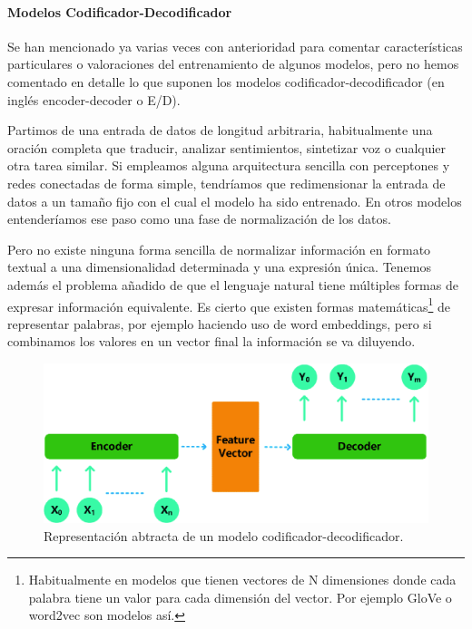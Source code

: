 \paragraph{Modelos Codificador-Decodificador}

Se han mencionado ya varias veces con anterioridad para comentar características particulares o valoraciones del entrenamiento de algunos modelos, pero no hemos comentado en detalle lo que suponen los modelos codificador-decodificador (en inglés encoder-decoder o E/D). 

Partimos de una entrada de datos de longitud arbitraria, habitualmente una oración completa que traducir, analizar sentimientos, sintetizar voz o cualquier otra tarea similar. Si empleamos alguna arquitectura sencilla con perceptones y redes conectadas de forma simple, tendríamos que redimensionar la entrada de datos a un tamaño fijo con el cual el modelo ha sido entrenado. En otros modelos entenderíamos ese paso como una fase de normalización de los datos.

Pero no existe ninguna forma sencilla de normalizar información en formato textual a una dimensionalidad determinada y una expresión única. Tenemos además el problema añadido de que el lenguaje natural tiene múltiples formas de expresar información equivalente. Es cierto que existen formas matemáticas\footnote{Habitualmente en modelos que tienen vectores de N dimensiones donde cada palabra tiene un valor para cada dimensión del vector. Por ejemplo GloVe o word2vec son modelos así.} de representar palabras, por ejemplo haciendo uso de word embeddings, pero si combinamos los valores en un vector final la información se va diluyendo.

\begin{figure}[H]
\centering
\includegraphics[width=14cm]{5_resultados_img/e-d.png}
\caption{Representación abtracta de un modelo codificador-decodificador.}
\label{fig:figure1}
\end{figure}

